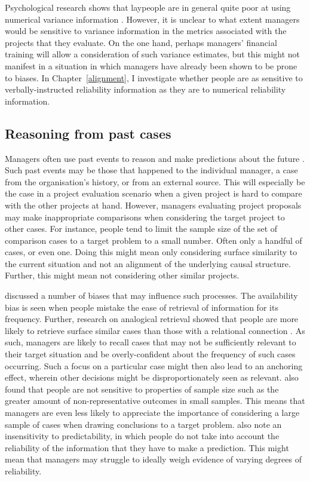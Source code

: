\documentclass[a4paper, nobind, dvipsnames]{templates/ociamthesis}
\theoremstyle{definition}
\theoremstyle{definition}
\theoremstyle{definition}
\theoremstyle{definition}
\theoremstyle{remark}
\begin{document}
Psychological research shows that laypeople are in general quite poor at using
numerical variance information \autocite{galesic2010,konold1993,vivalt2018,batteux2020}. However, it is unclear to what extent managers would be sensitive
to variance information in the metrics associated with the projects that they
evaluate. On the one hand, perhaps managers' financial training will allow a
consideration of such variance estimates, but this might not manifest in a
situation in which managers have already been shown to be prone to biases. In
Chapter~\ref{alignment}, I investigate whether people are as sensitive to
verbally-instructed reliability information as they are to numerical reliability
information.

\hypertarget{reasoning-from-past-cases}{%
\subsection{Reasoning from past cases}\label{reasoning-from-past-cases}}

Managers often use past events to reason and make predictions about the future
\autocite{einhorn1987}. Such past events may be those that happened to the individual
manager, a case from the organisation's history, or from an external source.
This will especially be the case in a project evaluation scenario when a given
project is hard to compare with the other projects at hand. However, managers
evaluating project proposals may make inappropriate comparisons when considering
the target project to other cases. For instance, people tend to limit the sample
size of the set of comparison cases to a target problem to a small number. Often
only a handful of cases, or even one. Doing this might mean only considering
surface similarity to the current situation and not an alignment of the
underlying causal structure. Further, this might mean not considering other
similar projects.

\textcite{tversky1974} discussed a number of biases that may influence such processes. The
availability bias is seen when people mistake the ease of retrieval of
information for its frequency. Further, research on analogical retrieval showed
that people are more likely to retrieve surface similar cases than those with a
relational connection \autocite{gentner1993}. As such, managers are likely to recall
cases that may not be sufficiently relevant to their target situation and be
overly-confident about the frequency of such cases occurring. Such a focus on a
particular case might then also lead to an anchoring effect, wherein other
decisions might be disproportionately seen as relevant. \textcite{tversky1974} also found
that people are not sensitive to properties of sample size such as the greater
amount of non-representative outcomes in small samples. This means that managers
are even less likely to appreciate the importance of considering a large sample
of cases when drawing conclusions to a target problem. \textcite{tversky1974} also note an
insensitivity to predictability, in which people do not take into account the
reliability of the information that they have to make a prediction. This might
mean that managers may struggle to ideally weigh evidence of varying degrees of
reliability.
\end{document}
